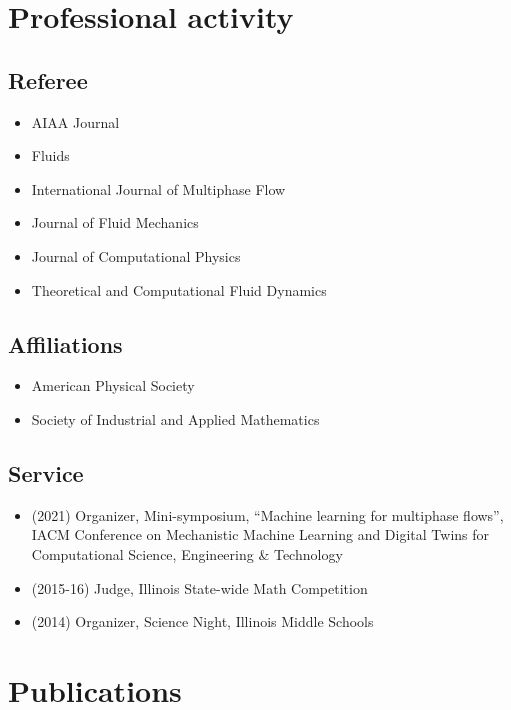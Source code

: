\section{Professional activity}

\subsection{Referee}

\begin{itemize}
    \item AIAA Journal
    \item Fluids
    \item International Journal of Multiphase Flow
    \item Journal of Fluid Mechanics
    \item Journal of Computational Physics
    \item Theoretical and Computational Fluid Dynamics
\end{itemize}

\subsection{Affiliations}

\begin{itemize}
    \item American Physical Society
    \item Society of Industrial and Applied Mathematics
\end{itemize}

\subsection{Service}

\begin{itemize}
    \item (2021) Organizer, Mini-symposium, ``Machine learning for multiphase flows'', IACM Conference on Mechanistic Machine Learning and Digital Twins for Computational Science, Engineering \& Technology
    \item (2015-16) Judge, Illinois State-wide Math Competition
    \item (2014) Organizer, Science Night, Illinois Middle Schools
\end{itemize}


\section{Publications}

